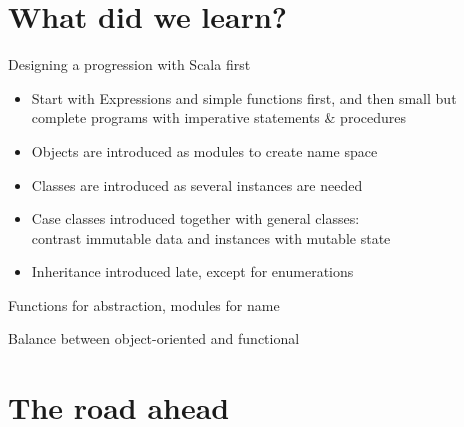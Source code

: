 \documentclass[aspectratio=169]{beamer}
\newcommand{\EndSlide}{\begin{frame}[plain]\endpage\end{frame}}
\newcommand{\Section}[1]{\titleimagecolor{red}\section{#1}}
\newenvironment{Slide}[1]%
  {\begin{frame}[environment=Slide]{#1}}
  {\end{frame}}%
\begin{document}
\Section{What did we learn?}

\begin{Slide}{Designing a progression with Scala first}
\begin{itemize}
  \item Start with Expressions and simple functions first, and then small but complete programs with imperative statements \& procedures 
  \item Objects are introduced as modules to create name space
  \item Classes are introduced as several instances are needed
  \item Case classes introduced together with general classes: \\
   contrast immutable data and instances with mutable state
  \item Inheritance introduced late, except for enumerations
\end{itemize}
\end{Slide}  


\begin{Slide}{}
  
\end{Slide}  

\begin{Slide}{Functions for abstraction, modules for name}
  
\end{Slide}  


\begin{Slide}{Balance between object-oriented and functional}
  
\end{Slide}  


\Section{The road ahead}


\EndSlide
\end{document}
